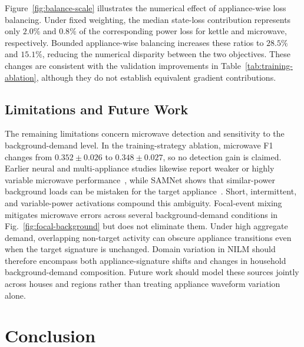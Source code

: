 \documentclass[journal]{IEEEtran}
\begin{document}
\begingroup
{}
Figure~\ref{fig:balance-scale} illustrates the numerical effect of appliance-wise loss balancing. Under fixed weighting, the median state-loss contribution represents only $2.0\%$ and $0.8\%$ of the corresponding power loss for kettle and microwave, respectively. Bounded appliance-wise balancing increases these ratios to $28.5\%$ and $15.1\%$, reducing the numerical disparity between the two objectives. These changes are consistent with the validation improvements in Table~\ref{tab:training-ablation}, although they do not establish equivalent gradient contributions.
\par
\endgroup

\subsection{Limitations and Future Work}

The remaining limitations concern microwave detection and sensitivity to the background-demand level. In the training-strategy ablation, microwave F1 changes from $0.352\pm0.026$ to $0.348\pm0.027$, so no detection gain is claimed. Earlier neural and multi-appliance studies likewise report weaker or highly variable microwave performance~\cite{kelly2015neural,faustine2020unet,xiong2024matnilm}, while SAMNet shows that similar-power background loads can be mistaken for the target appliance~\cite{liu2022samnet}. Short, intermittent, and variable-power activations compound this ambiguity. Focal-event mixing mitigates microwave errors across several background-demand conditions in Fig.~\ref{fig:focal-background} but does not eliminate them. Under high aggregate demand, overlapping non-target activity can obscure appliance transitions even when the target signature is unchanged. Domain variation in NILM should therefore encompass both appliance-signature shifts and changes in household background-demand composition. Future work should model these sources jointly across houses and regions rather than treating appliance waveform variation alone.

\section{Conclusion}
\end{document}
